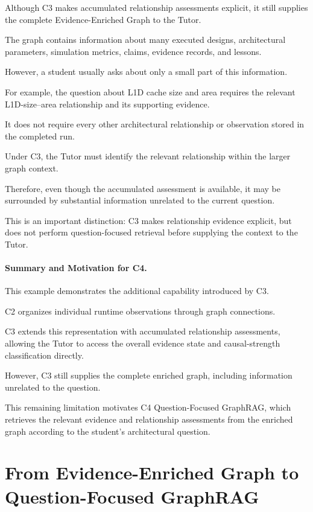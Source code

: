 Although C3 makes accumulated
relationship assessments explicit,
it still supplies the complete
Evidence-Enriched Graph
to the Tutor.

The graph contains information
about many executed designs,
architectural parameters,
simulation metrics, claims,
evidence records, and lessons.

However, a student usually asks
about only a small part
of this information.

For example, the question
about L1D cache size and area
requires the relevant
L1D-size--area relationship
and its supporting evidence.

It does not require every
other architectural relationship
or observation stored
in the completed run.

Under C3, the Tutor must
identify the relevant
relationship within
the larger graph context.

Therefore, even though
the accumulated assessment
is available, it may be
surrounded by substantial
information unrelated
to the current question.

This is an important distinction:
C3 makes relationship evidence
explicit, but does not perform
question-focused retrieval
before supplying the context
to the Tutor.


\paragraph{Summary and Motivation for C4.}

This example demonstrates
the additional capability
introduced by C3.

C2 organizes individual
runtime observations
through graph connections.

C3 extends this representation
with accumulated relationship
assessments, allowing the Tutor
to access the overall evidence
state and causal-strength
classification directly.

However, C3 still supplies
the complete enriched graph,
including information
unrelated to the question.

This remaining limitation
motivates C4 Question-Focused
GraphRAG, which retrieves
the relevant evidence
and relationship assessments
from the enriched graph
according to the student's
architectural question.


\section{From Evidence-Enriched Graph to Question-Focused GraphRAG}
\label{app:p5_c4_example}

